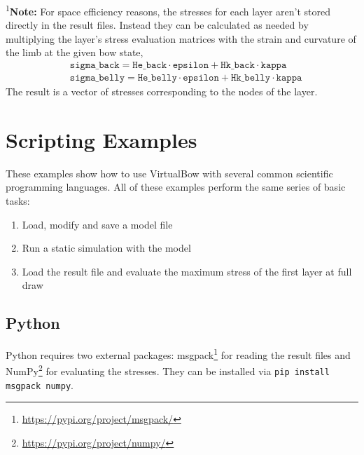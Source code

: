 \documentclass[12pt]{article}
\begin{document}
\textsuperscript{1}\textbf{Note:} For space efficiency reasons, the stresses for each layer aren't stored directly in the result files.
Instead they can be calculated as needed by multiplying the layer's stress evaluation matrices with the strain and curvature of the limb at the given bow state,
%
\begin{align*}
&\mathrm{\texttt{sigma\_back}} = \mathrm{\texttt{He\_back}} \cdot \mathrm{\texttt{epsilon}} + \mathrm{\texttt{Hk\_back}} \cdot \mathrm{\texttt{kappa}}\\
&\mathrm{\texttt{sigma\_belly}} = \mathrm{\texttt{He\_belly}} \cdot \mathrm{\texttt{epsilon}} + \mathrm{\texttt{Hk\_belly}} \cdot \mathrm{\texttt{kappa}}
\end{align*}
%
The result is a vector of stresses corresponding to the nodes of the layer.


\newpage
\section{Scripting Examples}
\label{sec:scripting-examples}

These examples show how to use VirtualBow with several common scientific programming languages.
All of these examples perform the same series of basic tasks:

\begin{enumerate}
\item Load, modify and save a model file
\item Run a static simulation with the model
\item Load the result file and evaluate the maximum stress of the first layer at full draw
\end{enumerate}

\subsection{Python}

Python requires two external packages: msgpack\footnote{\url{https://pypi.org/project/msgpack/}} for reading the result files and NumPy\footnote{\url{https://pypi.org/project/numpy/}} for evaluating the stresses. They can be installed via \texttt{pip install msgpack numpy}.
\end{document}
